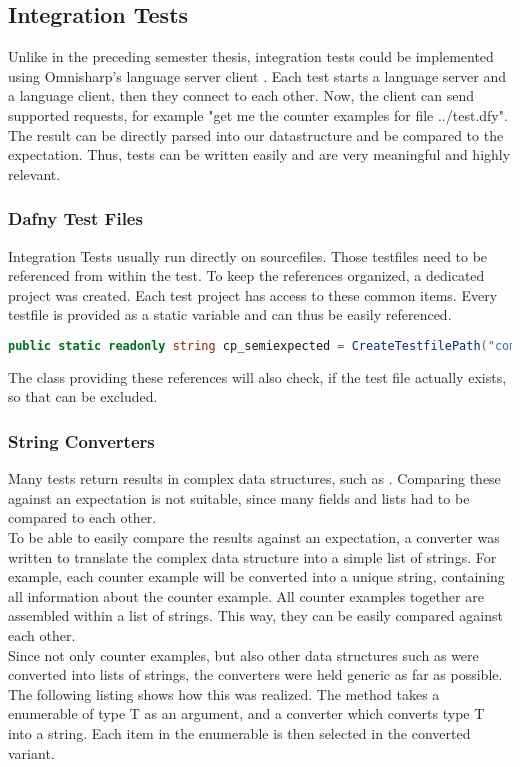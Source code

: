 \subsection{Integration Tests}
Unlike in the preceding semester thesis, integration tests could be implemented using Omnisharp's language server client \cite{omnisharpClient}. Each test starts a language server and a language client, then they connect to each other. Now, the client can send supported requests, for example "get me the counter examples for file ../test.dfy". The result can be directly parsed into our  datastructure and be compared to the expectation. Thus, tests can be written easily and are very meaningful and highly relevant.

\subsubsection{Dafny Test Files}
Integration Tests usually run directly on  sourcefiles. Those testfiles need to be referenced from within the test. To keep the references organized, a dedicated project  was created. Each test project has access to these common items. Every testfile is provided as a static variable and can thus be easily referenced.

\begin{lstlisting}[language=csharp, caption={Test File Reference}, captionpos=b, label={lst:semiExpectedCodeThing}]
public static readonly string cp_semiexpected = CreateTestfilePath("compile/semi_expected_error.dfy");
\end{lstlisting}
The class providing these references will also check, if the test file actually exists, so that  can be excluded.

\subsubsection{String Converters}
Many tests return results in complex data structures, such as . Comparing these against an expectation is not suitable, since many fields and lists had to be compared to each other.\\
To be able to easily compare the results against an expectation, a converter was written to translate the complex data structure into a simple list of strings. For example, each counter example will be converted into a unique string, containing all information about the counter example. All counter examples together are assembled within a list of strings. This way, they can be easily compared against each other.\\
Since not only counter examples, but also other data structures such as  were converted into lists of strings, the converters were held generic as far as possible. The following listing shows how this was realized. The method takes a enumerable of type T as an argument, and a converter which converts type T into a string. Each item in the enumerable is then selected in the converted variant.

